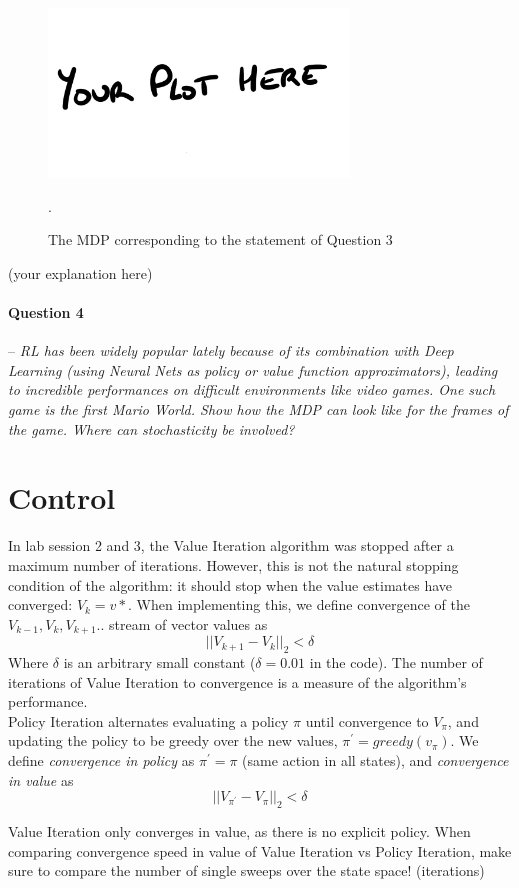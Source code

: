 \documentclass[a4paper]{article}
\newcommand{\question}[2]{
\paragraph{Question #1} -- \textit{#2}

}
\begin{document}
\begin{figure}[H]
    \centering
    \includegraphics[width=8cm]{plots/your_plot_here.png}
    \caption{The MDP corresponding to the statement of Question 3}.
    \label{fig:q3}
\end{figure}{}
(your explanation here)

\question{4}{RL has been widely popular lately because of its combination with Deep Learning (using Neural Nets as policy or value function approximators), leading to incredible performances on difficult environments like video games. One such game is the first Mario World. Show how the MDP can look like for the frames of the game. Where can stochasticity be involved?}


\section{Control}
In lab session 2 and 3, the Value Iteration algorithm was stopped after a maximum number of iterations. However, this is not the natural stopping condition of the algorithm: it should stop when the value estimates have converged: $V_k = v*$. When implementing this, we define convergence of the $V_{k-1},V_k,V_{k+1}..$ stream of vector values as $$ \vert\vert V_{k+1} - V_k \vert\vert_2 < \delta $$
Where $\delta$ is an arbitrary small constant ($\delta = 0.01$ in the code). The number of iterations of Value Iteration to convergence is a measure of the algorithm's performance.\\

Policy Iteration alternates evaluating a policy $\pi$ until convergence to $V_\pi$, and updating the policy to be greedy over the new values, $\pi ^\prime = greedy(v_\pi)$. We define \textit{convergence in policy} as  $\pi^\prime = \pi$ (same action in all states), and \textit{convergence in value} as $$ \vert\vert V_{\pi ^\prime} - V_\pi \vert\vert_2 < \delta $$

Value Iteration only converges in value, as there is no explicit policy. When comparing convergence speed in value of Value Iteration vs Policy Iteration, make sure to compare the number of single sweeps over the state space! (iterations)
\end{document}
